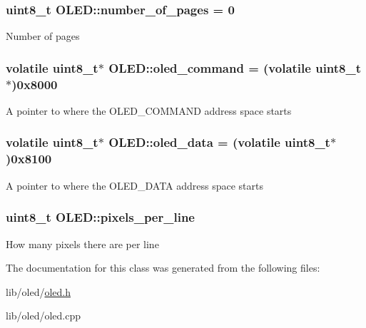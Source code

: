 \subsubsection[{\texorpdfstring{number\+\_\+of\+\_\+pages}{number_of_pages}}]{\setlength{\rightskip}{0pt plus 5cm}uint8\+\_\+t O\+L\+E\+D\+::number\+\_\+of\+\_\+pages = 0\hspace{0.3cm}{\ttfamily [private]}}\hypertarget{class_o_l_e_d_aaac99b0eb4e9dfe92b8571488dc89288}{}\label{class_o_l_e_d_aaac99b0eb4e9dfe92b8571488dc89288}
Number of pages 
\subsubsection[{\texorpdfstring{oled\+\_\+command}{oled_command}}]{\setlength{\rightskip}{0pt plus 5cm}volatile uint8\+\_\+t$\ast$ O\+L\+E\+D\+::oled\+\_\+command = (volatile uint8\+\_\+t$\ast$)0x8000\hspace{0.3cm}{\ttfamily [private]}}\hypertarget{class_o_l_e_d_af0a85ccd0274347b8c1ac77d298a14cf}{}\label{class_o_l_e_d_af0a85ccd0274347b8c1ac77d298a14cf}
A pointer to where the O\+L\+E\+D\+\_\+\+C\+O\+M\+M\+A\+ND address space starts 
\subsubsection[{\texorpdfstring{oled\+\_\+data}{oled_data}}]{\setlength{\rightskip}{0pt plus 5cm}volatile uint8\+\_\+t$\ast$ O\+L\+E\+D\+::oled\+\_\+data = (volatile uint8\+\_\+t$\ast$)0x8100\hspace{0.3cm}{\ttfamily [private]}}\hypertarget{class_o_l_e_d_a1bc54d49808f92ddfc354511b692df6f}{}\label{class_o_l_e_d_a1bc54d49808f92ddfc354511b692df6f}
A pointer to where the O\+L\+E\+D\+\_\+\+D\+A\+TA address space starts 
\subsubsection[{\texorpdfstring{pixels\+\_\+per\+\_\+line}{pixels_per_line}}]{\setlength{\rightskip}{0pt plus 5cm}uint8\+\_\+t O\+L\+E\+D\+::pixels\+\_\+per\+\_\+line\hspace{0.3cm}{\ttfamily [private]}}\hypertarget{class_o_l_e_d_a6ddac7b826eccac8c682c5246ef52b29}{}\label{class_o_l_e_d_a6ddac7b826eccac8c682c5246ef52b29}
How many pixels there are per line 

The documentation for this class was generated from the following files\+:\begin{DoxyCompactItemize}
\item 
lib/oled/\hyperlink{oled_8h}{oled.\+h}\item 
lib/oled/oled.\+cpp\end{DoxyCompactItemize}
